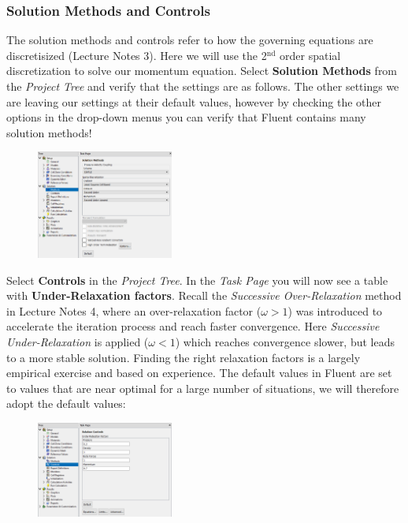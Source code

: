\documentclass[11pt,a4paper,oneside,hidelinks]{scrartcl}
\newcommand\bfr[1]{\textcolor[rgb]{1,0.00,0.00}{\textbf{\textsf{#1}}}}
\begin{document}
\subsubsection{Solution Methods and Controls}

The solution methods and controls refer to how the governing equations are discretisized (Lecture Notes 3). Here we will use the 2$^\mathrm{nd}$ order spatial discretization to solve our momentum equation. Select \bfr{Solution Methods} from the \emph{Project Tree} and verify that the settings are as follows. The other settings we are leaving our settings at their default values, however by checking the other options in the drop-down menus you can verify that Fluent contains many solution methods!
\begin{figure}[H]
\begin{center}
\includegraphics[width=0.4\textwidth,clip]{solution_methods.png}
\end{center}
\end{figure}

Select \bfr{Controls} in the \emph{Project Tree}. In the \emph{Task Page} you will now see a table with \bfr{Under-Relaxation factors}. Recall the \emph{Successive Over-Relaxation} method in Lecture Notes 4, where an over-relaxation factor ($\omega>1$) was introduced to accelerate the iteration process and reach faster convergence. Here \emph{Successive Under-Relaxation} is applied ($\omega<1$) which reaches convergence slower, but leads to a more stable solution. Finding the right relaxation factors is a largely empirical exercise and based on experience. The default values in Fluent are set to values that are near optimal for a large number of situations, we will therefore adopt the default values:
\begin{figure}[H]
\begin{center}
\includegraphics[width=0.4\textwidth,clip]{under_relaxation_factors.png}
\end{center}
\end{figure}
\end{document}
